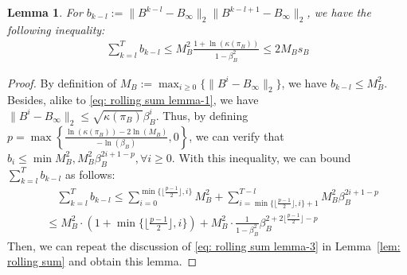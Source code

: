\documentclass{article}
\newtheorem{lemma}[thm]{Lemma}
\newcommand{\norm}[1]{\| #1 \|}
\begin{document}
\begin{lemma}\label{lemma 6} 
For $b_{k-l}:=\norm{B^{k-l}-B_\infty}_2\norm{B^{k-l+1}-B_\infty}_2$, we have the following inequality:
    \begin{align}
        \sum_{k=l}^T b_{k-l}\le M_B^2\frac{1+\ln(\kappa(\pi_B))}{1-\beta_B^2}\le 2M_Bs_B
    \end{align}
\end{lemma}
\begin{proof}
    By definition of $M_B:=\max_{i\ge0}\{\norm{B^i-B_\infty}_2\}$, we have $b_{k-l}\le M_B^2$. Besides, alike to \eqref{eq: rolling sum lemma-1}, we have $\norm{B^i-B_\infty}_2\le \sqrt{\kappa(\pi_B)}\beta_B^i$. Thus, by defining $p=\max\left\{\frac{\ln(\kappa(\pi_B))-2\ln(M_B)}{-\ln(\beta_B)},0\right\}$, we can verify that $b_{i}\le \min{M_B^2,M_B^2\beta_B^{2i+1-p}},\forall i \ge 0$. With this inequality, we can bound $\sum_{k=l}^Tb_{k-l}$ as follows:
    \begin{align}
        &\quad\sum_{k=l}^Tb_{k-l} \le \sum_{i=0}^{\min\{\lfloor \frac{p-1}{2} \rfloor, i\}}M_B^2+\sum_{i=\min\{\lfloor \frac{p-1}{2} \rfloor, i\}+1}^{T-l}M_B^2\beta_B^{2i+1-p}\nonumber\\
        &\le M_B^2\cdot(1+\min\{\lfloor \frac{p-1}{2} \rfloor, i\})+M_B^2\cdot\frac{1}{1-\beta_B^2}\beta_B^{2+2\lfloor \frac{p-1}{2}\rfloor-p}
    \end{align}
Then, we can repeat the discussion of \eqref{eq: rolling sum lemma-3} in Lemma~\ref{lem: rolling sum} and obtain this lemma.
    
\end{proof}
\end{document}
